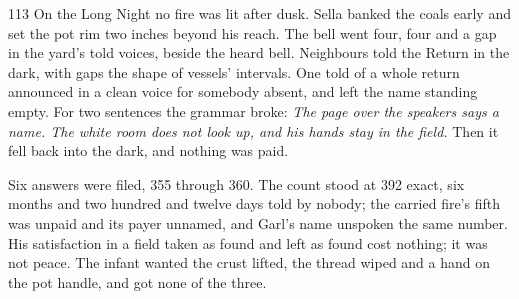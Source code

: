\begin{CRchronicle}{113}
On the Long Night no fire was lit after dusk. Sella banked the coals early and set the pot rim two inches beyond his reach. The bell went four, four and a gap in the yard’s told voices, beside the heard bell. Neighbours told the Return in the dark, with gaps the shape of vessels’ intervals. One told of a whole return announced in a clean voice for somebody absent, and left the name standing empty. For two sentences the grammar broke: \emph{The page over the speakers says a name. The white room does not look up, and his hands stay in the field.} Then it fell back into the dark, and nothing was paid.

Six answers were filed, 355 through 360. The count stood at 392 exact, six months and two hundred and twelve days told by nobody; the carried fire’s fifth was unpaid and its payer unnamed, and Garl’s name unspoken the same number. His satisfaction in a field taken as found and left as found cost nothing; it was not peace. The infant wanted the crust lifted, the thread wiped and a hand on the pot handle, and got none of the three.
\end{CRchronicle}
